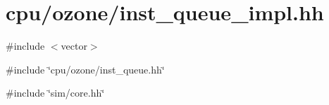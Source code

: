 \hypertarget{ozone_2inst__queue__impl_8hh}{
\section{cpu/ozone/inst\_\-queue\_\-impl.hh}
\label{ozone_2inst__queue__impl_8hh}
}
{\ttfamily \#include $<$vector$>$}\par
{\ttfamily \#include \char`\"{}cpu/ozone/inst\_\-queue.hh\char`\"{}}\par
{\ttfamily \#include \char`\"{}sim/core.hh\char`\"{}}\par
